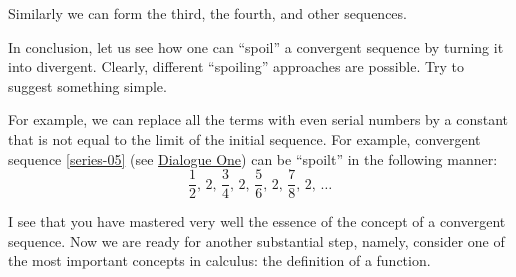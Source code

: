 {Similarly we can form the third, the fourth, and other sequences.

In conclusion, let us see how one can ``spoil'' a convergent sequence by turning it into divergent. Clearly, different ``spoiling'' approaches are possible. Try to suggest something simple.

\rdr For example, we can replace all the terms with even serial numbers by a constant that is not equal to the limit of the initial sequence. For example, convergent sequence \eqref{series-05} (see \hyperref[infinite-seq]{Dialogue One})  can be ``spoilt'' in the following manner:
\begin{equation*}%
\frac{1}{2}, \, 2, \, \frac{3}{4}, \, 2, \, \frac{5}{6}, \, 2, \, \frac{7}{8}, \, 2,  \, \ldots
\end{equation*}

\athr I see that you have mastered very well the essence of the concept of a convergent sequence. Now we are ready for another substantial step, namely, consider one of the most important concepts in calculus: the definition of a function.
}
